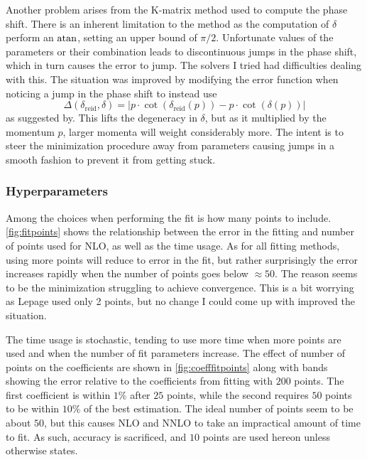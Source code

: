 Another problem arises from the K-matrix method used to compute the phase shift.
There is an inherent limitation to the method as the computation of \(\delta\)
perform an \(\atan\), setting an upper bound of \(\pi/2\). Unfortunate values of
the parameters or their combination leads to discontinuous jumps in the phase
shift, which in turn causes the error to jump. The solvers I tried had
difficulties dealing with this. The situation was improved by modifying
the error function when noticing a jump in the phase shift to instead use
\begin{equation*}
  \Delta(\delta_{\text{reid}}, \delta) = \left| p\cdot\cot\left( \delta_{\text{reid}}(p) \right) - p\cdot\cot\left( \delta(p) \right)\right|
\end{equation*}
as suggested by\cite{steele1998regularization,taylor}. This lifts the degeneracy
in \(\delta\), but as it multiplied by the momentum \(p\), larger momenta will
weight considerably more. The intent is to steer the minimization procedure away
from parameters causing jumps in a smooth fashion to prevent it from getting stuck.

\subsubsection{Hyperparameters}

Among the choices when performing the fit is how many points to include.
 \cref{fig:fitpoints} shows the
relationship between the error in the fitting and number of points used for NLO,
as well as the time usage. As for all fitting methods, using more points will
reduce to error in the fit, but rather surprisingly the error increases rapidly
when the number of points goes below \(\approx 50\). The reason seems to be the
minimization struggling to achieve convergence. This is a bit worrying as
Lepage\cite[p.~35]{lepage1997renormalize} used only 2 points, but no change I
could come up with improved the situation.

The time usage is stochastic, tending to use more time when more points are used
and when the number of fit parameters increase.
The effect of number of points
on the coefficients are shown in \cref{fig:coefffitpoints} along with
bands showing the error relative to the coefficients from fitting with \(200\)
points. The first coefficient is within \(1\%\) after \(25\) points, while the
second requires \(50\) points to be within \(10\%\) of the best estimation. The
ideal number of points seem to be about \(50\), but this causes NLO and NNLO to
take an impractical amount of time to fit. As such, accuracy is sacrificed, and
\(10\) points are used hereon unless otherwise states. 

